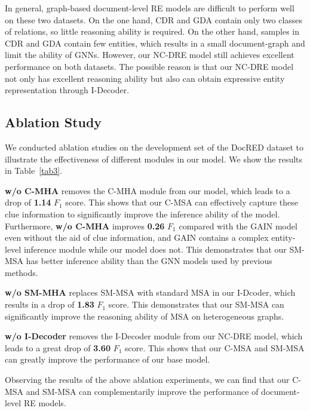 \documentclass[sigconf,natbib=true]{acmart}
\begin{document}
In general, graph-based document-level RE models are difficult to perform well on these two datasets.
On the one hand, CDR and GDA contain only two classes of relations, so little reasoning ability is required. On the other hand, samples in CDR and GDA contain few entities, which results in a small document-graph and limit the ability of GNNs.
However, our NC-DRE model still achieves excellent performance on both datasets.
The possible reason is that our NC-DRE model not only has excellent reasoning ability but also can obtain expressive entity representation through I-Decoder.


\subsection{Ablation Study}
We conducted ablation studies on the development set of the DocRED dataset to illustrate the effectiveness of different modules in our model.
We show the results in Table~\ref{tab3}. 

\textbf{w/o C-MHA} removes the C-MHA module from our model, which leads to a drop of \textbf{1.14} $F_1$ score.
This shows that our C-MSA can effectively capture these clue information to significantly improve the inference ability of the model.
Furthermore, \textbf{w/o C-MHA} improves \textbf{0.26} $F_1$ compared with the GAIN model even without the aid of clue information, and GAIN contains a complex entity-level inference module while our model does not.
This demonstrates that our SM-MSA has better inference ability than the GNN models used by previous methods.

\textbf{w/o SM-MHA} replaces SM-MSA with standard MSA in our I-Dcoder, which results in a drop of \textbf{1.83} $F_1$ score.
This demonstrates that our SM-MSA can significantly improve the reasoning ability of MSA on heterogeneous graphs.

\textbf{w/o I-Decoder} removes the I-Decoder module from our NC-DRE model, which leads to a great drop of \textbf{3.60} $F_1$ score.
This shows that our C-MSA and SM-MSA can greatly improve the performance of our base model.

Observing the results of the above ablation experiments, we can find that our C-MSA and SM-MSA can complementarily improve the performance of document-level RE models.
\end{document}
